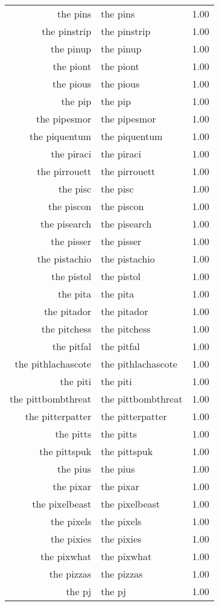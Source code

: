 \begin{table}[ht]
\begin{tabular}{rlr}
  the pins & the pins & 1.00 \\ 
  the pinstrip & the pinstrip & 1.00 \\ 
  the pinup & the pinup & 1.00 \\ 
  the piont & the piont & 1.00 \\ 
  the pious & the pious & 1.00 \\ 
  the pip & the pip & 1.00 \\ 
  the pipesmor & the pipesmor & 1.00 \\ 
  the piquentum & the piquentum & 1.00 \\ 
  the piraci & the piraci & 1.00 \\ 
  the pirrouett & the pirrouett & 1.00 \\ 
  the pisc & the pisc & 1.00 \\ 
  the piscon & the piscon & 1.00 \\ 
  the pisearch & the pisearch & 1.00 \\ 
  the pisser & the pisser & 1.00 \\ 
  the pistachio & the pistachio & 1.00 \\ 
  the pistol & the pistol & 1.00 \\ 
  the pita & the pita & 1.00 \\ 
  the pitador & the pitador & 1.00 \\ 
  the pitchess & the pitchess & 1.00 \\ 
  the pitfal & the pitfal & 1.00 \\ 
  the pithlachascote & the pithlachascote & 1.00 \\ 
  the piti & the piti & 1.00 \\ 
  the pittbombthreat & the pittbombthreat & 1.00 \\ 
  the pitterpatter & the pitterpatter & 1.00 \\ 
  the pitts & the pitts & 1.00 \\ 
  the pittspuk & the pittspuk & 1.00 \\ 
  the pius & the pius & 1.00 \\ 
  the pixar & the pixar & 1.00 \\ 
  the pixelbeast & the pixelbeast & 1.00 \\ 
  the pixels & the pixels & 1.00 \\ 
  the pixies & the pixies & 1.00 \\ 
  the pixwhat & the pixwhat & 1.00 \\ 
  the pizzas & the pizzas & 1.00 \\ 
  the pj & the pj & 1.00 \\ 

\end{tabular}
\end{table}
